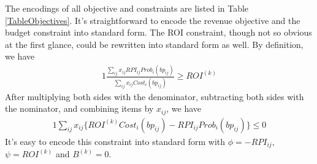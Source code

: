 \documentclass{article}
\newcommand{\sumij}{\sum\limits_{ij}}
\newcommand{\sx}{x_{ij}}
\newcommand{\sbp}{bp_{ij}}
\newcommand{\sumijx}[1]{\sumij\sx{}#1}
\newcommand{\sProb}{Prob_i(\sbp)}
\newcommand{\sCost}{Cost_i(\sbp)}
\newcommand{\sB}{B^{(k)}}
\newcommand{\sROI}{ROI^{(k)}}
\newcommand{\sCPI}{RPI_{ij}}
\newcommand{\sRevenuePforP}{\sumijx{\sCPI\sProb}}
\newcommand{\sBiddingCost}{\sumijx{\sCost}}
\newcommand{\pprob}{\phi}
\newcommand{\pcost}{\psi}
\begin{document}
The encodings of all objective and constraints are listed in Table \ref{TableObjectives}.
It's straightforward to encode the revenue objective and the budget constraint into standard form.
The ROI constraint, though not so obvious at the first glance, could be rewritten into standard form as well.
By definition, we have
\begin{alignat}{1}
\frac{\sRevenuePforP}{\sBiddingCost}\ge\sROI
\end{alignat}
After multiplying both sides with the denominator,
    subtracting both sides with the nominator,
    and combining items by $\sx$, we have
\begin{alignat}{1}
\sumijx{\{\sROI\sCost-\sCPI\sProb\}}\le0
\end{alignat}
It's easy to encode this constraint into standard form with $\pprob=-\sCPI$, $\pcost=\sROI$ and $\sB=0$.
\end{document}
